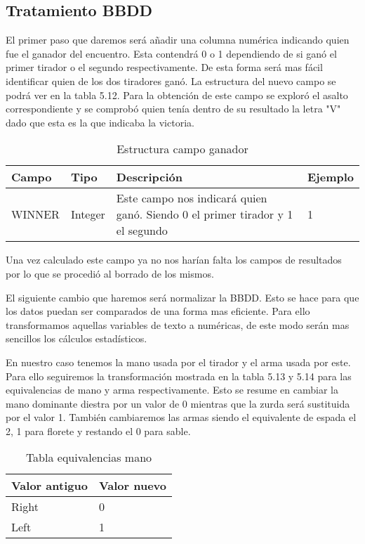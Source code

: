 \subsection{Tratamiento BBDD}

El primer paso que daremos será añadir una columna numérica indicando quien
fue el ganador del encuentro. Esta contendrá 0 o 1 dependiendo de si ganó
el primer tirador o el segundo respectivamente. De esta forma será mas fácil
identificar quien de los dos tiradores ganó. La estructura del nuevo campo
se podrá ver en la tabla 5.12. Para la obtención de este campo se exploró
el asalto correspondiente y se comprobó quien tenía dentro de su resultado
la letra "V" dado que esta es la que indicaba la victoria.

\begin{table}[]
  \centering
  \caption{Estructura campo ganador}
  \label{tab:Estructura campo ganador}
  \begin{tabular}{|llll|}
    \hline \rowcolor[HTML]{C0C0C0}
    Campo & Tipo & Descripción & Ejemplo \\ \hline
    WINNER & Integer & Este campo nos indicará quien ganó. Siendo 0 el primer tirador y 1 el segundo & 1 \\ \hline
  \end{tabular}
\end{table}

Una vez calculado este campo ya no nos harían falta los campos de resultados
por lo que se procedió al borrado de los mismos.

El siguiente cambio que haremos será normalizar la BBDD. Esto se hace para
que los datos puedan ser comparados de una forma mas eficiente. Para ello
transformamos aquellas variables de texto a numéricas, de este modo serán
mas sencillos los cálculos estadísticos.

En nuestro caso tenemos la mano usada por el tirador y el arma usada por este.
Para ello seguiremos la transformación mostrada en la tabla 5.13 y 5.14 para
las equivalencias de mano y arma respectivamente. Esto se resume en
cambiar la mano dominante diestra por un valor de 0 mientras que la zurda será
sustituida por el valor 1. También cambiaremos las armas siendo el equivalente
de espada el 2, 1 para florete y restando el 0 para sable.

\begin{table}[]
  \centering
  \caption{Tabla equivalencias mano}
  \label{tab:Tabla equivalencias mano}
  \begin{tabular}{|ll|}
    \hline
    \rowcolor[HTML]{C0C0C0}
    Valor antiguo & Valor nuevo \\ \hline
    Right & 0 \\ \hline
    Left & 1 \\ \hline
  \end{tabular}
\end{table}


